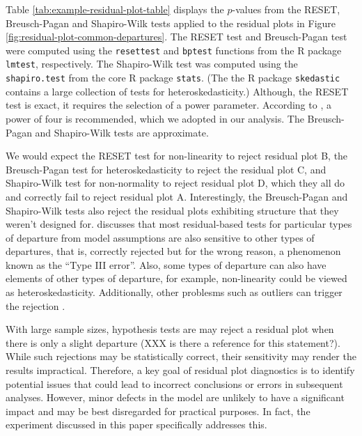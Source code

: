 \documentclass[]{interact}
\theoremstyle{plain}%
\theoremstyle{definition}
\theoremstyle{remark}
\begin{document}
Table \ref{tab:example-residual-plot-table} displays the \(p\)-values
from the RESET, Breusch-Pagan and Shapiro-Wilk tests applied to the
residual plots in Figure \ref{fig:residual-plot-common-departures}. The
RESET test and Breusch-Pagan test were computed using the
\texttt{resettest} and \texttt{bptest} functions from the R package
\texttt{lmtest}, respectively. The Shapiro-Wilk test was computed using
the \texttt{shapiro.test} from the core R package \texttt{stats}. (The
the R package \texttt{skedastic} \citep{skedastic} contains a large
collection of tests for heteroskedasticity.) Although, the RESET test is
exact, it requires the selection of a power parameter. According to
\citet{ramsey_tests_1969}, a power of four is recommended, which we
adopted in our analysis. The Breusch-Pagan and Shapiro-Wilk tests are
approximate.

We would expect the RESET test for non-linearity to reject residual plot
B, the Breusch-Pagan test for heteroskedasticity to reject the residual
plot C, and Shapiro-Wilk test for non-normality to reject residual plot
D, which they all do and correctly fail to reject residual plot A.
Interestingly, the Breusch-Pagan and Shapiro-Wilk tests also reject the
residual plots exhibiting structure that they weren't designed for.
\citet{cook1982residuals} discusses that most residual-based tests for
particular types of departure from model assumptions are also sensitive
to other types of departures, that is, correctly rejected but for the
wrong reason, a phenomenon known as the ``Type III error''. Also, some
types of departure can also have elements of other types of departure,
for example, non-linearity could be viewed as heteroskedasticity.
Additionally, other problesms such as outliers can trigger the rejection
\citep{cook_applied_1999}.

With large sample sizes, hypothesis tests are may reject a residual plot
when there is only a slight departure (XXX is there a reference for this
statement?). While such rejections may be statistically correct, their
sensitivity may render the results impractical. Therefore, a key goal of
residual plot diagnostics is to identify potential issues that could
lead to incorrect conclusions or errors in subsequent analyses. However,
minor defects in the model are unlikely to have a significant impact and
may be best disregarded for practical purposes. In fact, the experiment
discussed in this paper specifically addresses this.
\end{document}
